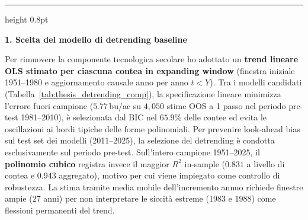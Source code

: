 \documentclass[10pt,a4paper]{article}
\begin{document}
\vspace{0.35em}
\hrule height 0.8pt
\vspace{0.45em}

\noindent \textbf{\large 1. Scelta del modello di detrending baseline}
\vspace{0.15em}

\noindent Per rimuovere la componente tecnologica secolare ho adottato un \textbf{trend lineare OLS stimato per ciascuna contea in expanding window} (finestra iniziale 1951--1980 e aggiornamento causale anno per anno $t < Y$). Tra i modelli candidati (Tabella~\ref{tab:thesis_detrending_comp}), la specificazione lineare minimizza l'errore fuori campione ($5.77$\,bu/ac su $4{,}050$ stime OOS a 1 passo nel periodo pre-test 1981--2010), \`e selezionata dal BIC nel $65.9\%$ delle contee ed evita le oscillazioni ai bordi tipiche delle forme polinomiali. Per prevenire look-ahead bias sul test set dei modelli (2011--2025), la selezione del detrending \`e condotta esclusivamente sul periodo pre-test. Sull'intero campione 1951--2025, il \textbf{polinomio cubico} registra invece il maggior $R^2$ in-sample ($0.831$ a livello di contea e $0.943$ aggregato), motivo per cui viene impiegato come controllo di robustezza. La stima tramite media mobile dell'incremento annuo richiede finestre ampie ($27$ anni) per non interpretare le siccit\`a estreme (1983 e 1988) come flessioni permanenti del trend.
\end{document}
